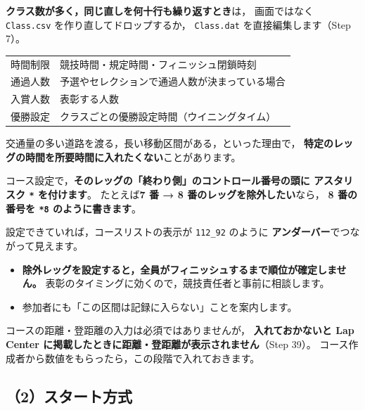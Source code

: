 \textbf{クラス数が多く，同じ直しを何十行も繰り返すとき}は，
画面ではなく \texttt{Class.csv} を作り直してドロップするか，
\texttt{Class.dat} を直接編集します（Step 7）。

\begin{center}
\small
\begin{tabular}{@{}P{24mm}P{122mm}@{}}
\toprule
{} &  \\
\midrule
時間制限 & 競技時間・規定時間・フィニッシュ閉鎖時刻 \\
通過人数 & 予選やセレクションで通過人数が決まっている場合 \\
入賞人数 & 表彰する人数 \\
優勝設定 & クラスごとの優勝設定時間（ウイニングタイム） \\
\bottomrule
\end{tabular}
\end{center}

\begin{Note}
交通量の多い道路を渡る，長い移動区間がある，といった理由で，
\textbf{特定のレッグの時間を所要時間に入れたくない}ことがあります。

コース設定で，\textbf{そのレッグの「終わり側」のコントロール番号の頭に
アスタリスク \texttt{*} を付けます}。
たとえば\textbf{7 番 → 8 番のレッグを除外したい}なら，
\textbf{8 番の番号を \texttt{*8} のように書きます}。\ver

設定できていれば，コースリストの表示が \texttt{112\_92} のように
\textbf{アンダーバー}でつながって見えます。

\begin{itemize}
\item \textbf{除外レッグを設定すると，全員がフィニッシュするまで順位が確定しません。}
      表彰のタイミングに効くので，競技責任者と事前に相談します。
\item 参加者にも「この区間は記録に入らない」ことを案内します。
\end{itemize}
\end{Note}

\begin{Note}[距離・登距離を入れておく]
コースの距離・登距離の入力は必須ではありませんが，
\textbf{入れておかないと Lap Center に掲載したときに距離・登距離が表示されません}（Step 39）。
コース作成者から数値をもらったら，この段階で入れておきます。
\end{Note}

\subsection*{（2）スタート方式}

